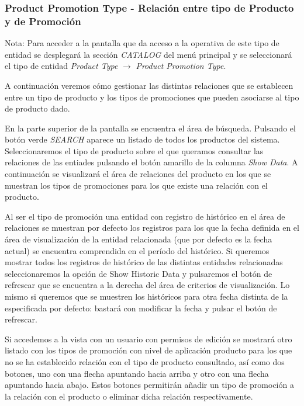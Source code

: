 \subsubsection{Product Promotion Type - Relación entre tipo de Producto y de Promoción}
\label{sub:product-promotion-type-relation}

Nota: Para acceder a la pantalla que da acceso a la operativa de este tipo de entidad se desplegará la sección \emph{CATALOG} del menú principal y se seleccionará el tipo de entidad \emph{Product Type} $\rightarrow$  \emph{Product Promotion Type}.


A continuación veremos cómo gestionar las distintas relaciones que se establecen entre un tipo de producto y los tipos de promociones que pueden asociarse al tipo de producto dado.


En la parte superior de la pantalla se encuentra el área de búsqueda. Pulsando el botón verde \emph{SEARCH} aparece un listado de todos los productos del sistema. Seleccionaremos el tipo de producto sobre el que queramos consultar las relaciones de las entiades pulsando el botón amarillo de la columna \emph{Show Data}. A continuación se visualizará el área de relaciones del producto en los que se muestran los tipos de promociones para los que existe una relación con el producto.

Al ser el tipo de promoción una entidad con registro de histórico en el área de relaciones se muestran por defecto los registros para los que la fecha definida en el área de visualización de la entidad relacionada (que por defecto es la fecha actual) se encuentra comprendida en el período del histórico. Si queremos mostrar todos los registros de histórico de las distintas entidades relacionadas seleccionaremos la opción de Show Historic Data y pulsaremos el botón de refrescar que se encuentra a la derecha del área de criterios de visualización. Lo mismo si queremos que se muestren los históricos para otra fecha distinta de la especificada por defecto: bastará con modificar la fecha y pulsar el botón de refrescar.

Si accedemos a la vista con un usuario con permisos de edición se mostrará otro listado con los tipos de promoción con nivel de aplicación producto para los que no se ha establecido relación con el tipo de producto consultado, así como dos botones, uno con una flecha apuntando hacia arriba y otro con una flecha apuntando hacia abajo. Estos botones permitirán añadir un tipo de promoción a la relación con el producto o eliminar dicha relación respectivamente. 

